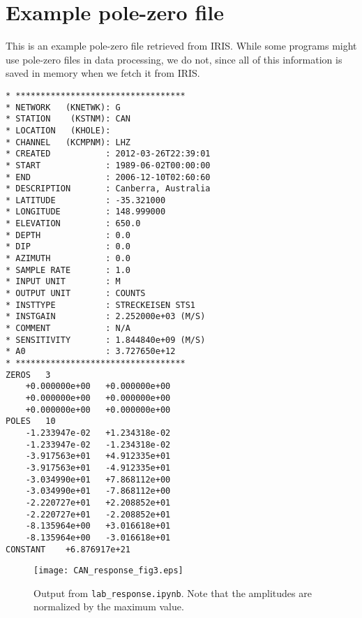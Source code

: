 \documentclass[11pt,titlepage,fleqn]{article}
\newcommand{\tfile}{{\tt lab\_response.ipynb}}
\begin{document}
\pagebreak

\appendix

\section{Example pole-zero file}
\label{sec:pz}

This is an example pole-zero file retrieved from IRIS. While some programs might use pole-zero files in data processing, we do not, since all of this information is saved in memory when we fetch it from IRIS.

\small
\begin{spacing}{1.0}
\begin{verbatim}
* **********************************
* NETWORK   (KNETWK): G
* STATION    (KSTNM): CAN
* LOCATION   (KHOLE): 
* CHANNEL   (KCMPNM): LHZ
* CREATED           : 2012-03-26T22:39:01
* START             : 1989-06-02T00:00:00
* END               : 2006-12-10T02:60:60
* DESCRIPTION       : Canberra, Australia
* LATITUDE          : -35.321000
* LONGITUDE         : 148.999000 
* ELEVATION         : 650.0  
* DEPTH             : 0.0  
* DIP               : 0.0  
* AZIMUTH           : 0.0  
* SAMPLE RATE       : 1.0
* INPUT UNIT        : M
* OUTPUT UNIT       : COUNTS
* INSTTYPE          : STRECKEISEN STS1
* INSTGAIN          : 2.252000e+03 (M/S)
* COMMENT           : N/A
* SENSITIVITY       : 1.844840e+09 (M/S)
* A0                : 3.727650e+12
* **********************************
ZEROS	3
	+0.000000e+00	+0.000000e+00
	+0.000000e+00	+0.000000e+00
	+0.000000e+00	+0.000000e+00
POLES	10
	-1.233947e-02	+1.234318e-02
	-1.233947e-02	-1.234318e-02
	-3.917563e+01	+4.912335e+01
	-3.917563e+01	-4.912335e+01
	-3.034990e+01	+7.868112e+00
	-3.034990e+01	-7.868112e+00
	-2.220727e+01	+2.208852e+01
	-2.220727e+01	-2.208852e+01
	-8.135964e+00	+3.016618e+01
	-8.135964e+00	-3.016618e+01
CONSTANT	+6.876917e+21
\end{verbatim}
\end{spacing}
\normalsize



%


\begin{figure}
\centering
\texttt{[image: CAN\_response\_fig3.eps]}
\caption[]
{{
Output from \tfile.
Note that the amplitudes are normalized by the maximum value.
}}
\label{fig1}
\end{figure}
\end{document}
